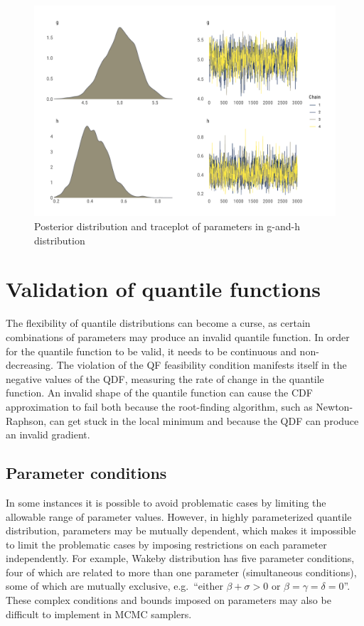 \documentclass[ba]{imsart}
\numberwithin{equation}{section}
\theoremstyle{plain}
\begin{document}
\begin{figure}

{\centering \includegraphics[width=0.8\linewidth]{BA-submission_files/figure-latex/gnh-combo-graph-1} 

}

\caption{Posterior distribution and traceplot of parameters in g-and-h distribution}\label{fig:gnh-combo-graph}
\end{figure}

\hypertarget{validation-of-quantile-functions}{%
\section{Validation of quantile functions}\label{validation-of-quantile-functions}}

The flexibility of quantile distributions can become a curse, as certain combinations of parameters may produce an invalid quantile function. In order for the quantile function to be valid, it needs to be continuous and non-decreasing. The violation of the QF feasibility condition manifests itself in the negative values of the QDF, measuring the rate of change in the quantile function. An invalid shape of the quantile function can cause the CDF approximation to fail both because the root-finding algorithm, such as Newton-Raphson, can get stuck in the local minimum and because the QDF can produce an invalid gradient.

\hypertarget{parameter-conditions}{%
\subsection{Parameter conditions}\label{parameter-conditions}}

In some instances it is possible to avoid problematic cases by limiting the allowable range of parameter values. However, in highly parameterized quantile distribution, parameters may be mutually dependent, which makes it impossible to limit the problematic cases by imposing restrictions on each parameter independently. For example, Wakeby distribution has five parameter conditions, four of which are related to more than one parameter (simultaneous conditions), some of which are mutually exclusive, e.g.~``either \(\beta+\sigma>0\) or \(\beta=\gamma=\delta=0\)''. These complex conditions and bounds imposed on parameters may also be difficult to implement in MCMC samplers.
\end{document}
